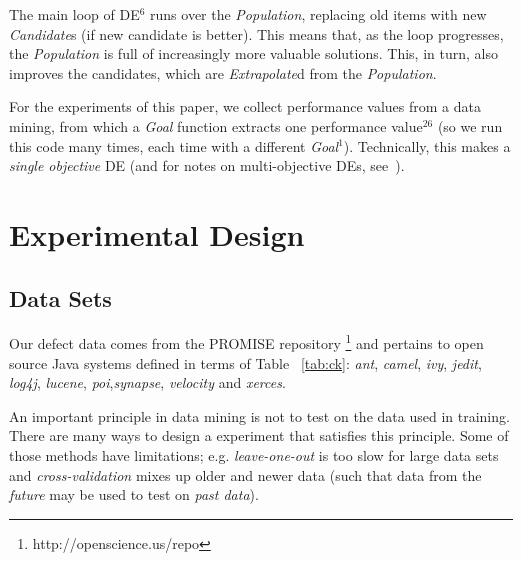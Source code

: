 \documentclass{sig-alternative}
\newcommand{\tab}[1]{Table ~\ref{tab:#1}}
\begin{document}
The main loop of DE$^{6}$ runs over the {\em Population}, replacing old items
with new {\em Candidate}s (if  new candidate is better).
This means that, as the loop progresses, the {\em Population} is full of increasingly
more valuable solutions. This, in turn, also improves  the candidates, which are {\em Extrapolate}d
from the {\em Population}.

For the experiments of this paper, we collect performance
values from a data mining, from which a {\em Goal} function extracts one 
performance value$^{26}$ (so we run this code many times, each time with
a different {\em Goal}$^{1}$).  Technically, this makes a  {\em single objective} DE (and for notes on multi-objective DEs, see~\cite{Coello05,zhang07,5583335}).






\section{Experimental Design}\label{sect:design}
 

\subsection{Data Sets}\label{sect:dataa}

Our defect data comes from the PROMISE repository \footnote{http://openscience.us/repo}
and pertains to 
open source Java systems defined in terms of \tab{ck}:  {\it ant}, {\it camel}, {\it ivy}, {\it jedit}, {\it log4j}, {\it lucene},
{\it poi},{\it synapse}, {\it velocity} and {\it xerces}. 

An important principle in data mining is not to test on the data used
in training.  There are many ways to design a experiment that satisfies this principle.
Some of those methods have  limitations; e.g.
{\em leave-one-out} is too slow for large data sets and
{\em cross-validation}   mixes up older and newer data  (such that
data from the {\em future} may be used to test on {\em past data}).
\end{document}
